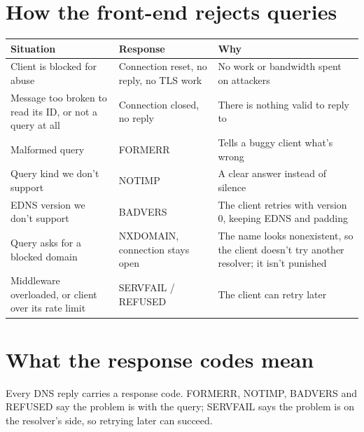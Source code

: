 \documentclass[11pt,a4paper]{article}
\begin{document}
\section{How the front-end rejects queries}

\begin{tabularx}{\linewidth}{@{}>{\raggedright\arraybackslash}p{58mm}>{\raggedright\arraybackslash}p{38mm}X@{}}
\toprule
\textbf{Situation} & \textbf{Response} & \textbf{Why} \\
\midrule
Client is blocked for abuse & Connection reset, no reply, no TLS work & No work or bandwidth spent
  on attackers \\
Message too broken to read its ID, or not a query at all & Connection closed, no reply & There is
  nothing valid to reply to \\
Malformed query & FORMERR & Tells a buggy client what's wrong \\
Query kind we don't support & NOTIMP & A clear answer instead of silence \\
EDNS version we don't support & BADVERS & The client retries with version 0, keeping EDNS and
  padding \\
Query asks for a blocked domain & NXDOMAIN, connection stays open & The name looks nonexistent,
  so the client doesn't try another resolver; it isn't punished \\
Middleware overloaded, or client over its rate limit & SERVFAIL / REFUSED & The client can retry
  later \\
\bottomrule
\end{tabularx}

\section{What the response codes mean}

Every DNS reply carries a response code. FORMERR, NOTIMP, BADVERS and REFUSED say the problem is
with the query; SERVFAIL says the problem is on the resolver's side, so retrying later can
succeed.
\end{document}

